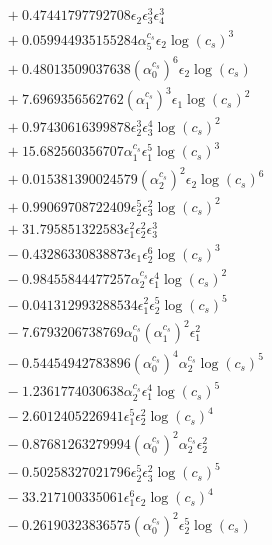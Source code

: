 \documentclass[10pt]{article}
\begin{document}
\begin{align*}
&{}  + 0.47441797792708 \epsilon_{2} \epsilon_{3}^{3} \epsilon_{4}^{3} \\
&{}  + 0.059944935155284 \alpha_{5}^{c_s} \epsilon_{2} \log{\left(c_{s} \right)}^{3} \\
&{}  + 0.48013509037638 \left(\alpha_{0}^{c_s}\right)^{6} \epsilon_{2} \log{\left(c_{s} \right)} \\
&{}  + 7.6969356562762 \left(\alpha_{1}^{c_s}\right)^{3} \epsilon_{1} \log{\left(c_{s} \right)}^{2} \\
&{}  + 0.97430616399878 \epsilon_{2}^{3} \epsilon_{3}^{4} \log{\left(c_{s} \right)}^{2} \\
&{}  + 15.682560356707 \alpha_{1}^{c_s} \epsilon_{1}^{5} \log{\left(c_{s} \right)}^{3} \\
&{}  + 0.015381390024579 \left(\alpha_{2}^{c_s}\right)^{2} \epsilon_{2} \log{\left(c_{s} \right)}^{6} \\
&{}  + 0.99069708722409 \epsilon_{2}^{5} \epsilon_{3}^{2} \log{\left(c_{s} \right)}^{2} \\
&{}  + 31.795851322583 \epsilon_{1}^{2} \epsilon_{2}^{2} \epsilon_{3}^{3} \\
&{}  - 0.43286330838873 \epsilon_{1} \epsilon_{2}^{6} \log{\left(c_{s} \right)}^{3} \\
&{}  - 0.98455844477257 \alpha_{2}^{c_s} \epsilon_{1}^{4} \log{\left(c_{s} \right)}^{2} \\
&{}  - 0.041312993288534 \epsilon_{1}^{2} \epsilon_{2}^{5} \log{\left(c_{s} \right)}^{5} \\
&{}  - 7.6793206738769 \alpha_{0}^{c_s} \left(\alpha_{1}^{c_s}\right)^{2} \epsilon_{1}^{2} \\
&{}  - 0.54454942783896 \left(\alpha_{0}^{c_s}\right)^{4} \alpha_{2}^{c_s} \log{\left(c_{s} \right)}^{5} \\
&{}  - 1.2361774030638 \alpha_{2}^{c_s} \epsilon_{1}^{4} \log{\left(c_{s} \right)}^{5} \\
&{}  - 2.6012405226941 \epsilon_{1}^{5} \epsilon_{2}^{2} \log{\left(c_{s} \right)}^{4} \\
&{}  - 0.87681263279994 \left(\alpha_{0}^{c_s}\right)^{2} \alpha_{2}^{c_s} \epsilon_{2}^{2} \\
&{}  - 0.50258327021796 \epsilon_{2}^{5} \epsilon_{3}^{2} \log{\left(c_{s} \right)}^{5} \\
&{}  - 33.217100335061 \epsilon_{1}^{6} \epsilon_{2} \log{\left(c_{s} \right)}^{4} \\
&{}  - 0.26190323836575 \left(\alpha_{0}^{c_s}\right)^{2} \epsilon_{2}^{5} \log{\left(c_{s} \right)} \\

\end{align*}
\end{document}
